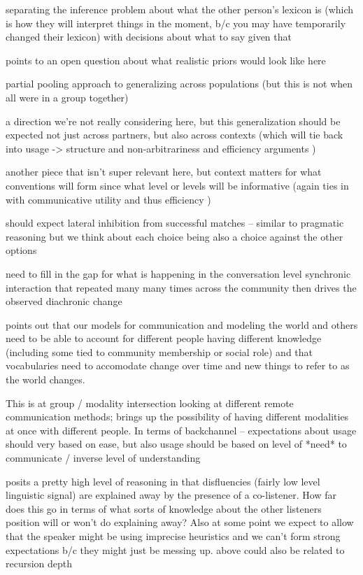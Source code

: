 \documentclass[]{article}
\begin{document}
\cite{hawkins2021} separating the inference problem about what the other person's lexicon is (which is how they will interpret things in the moment, b/c you may have temporarily changed their lexicon) with decisions about what to say given that 


points to an open question about what realistic priors would look like here

partial pooling approach to generalizing across populations (but this is not when all were in a group together) 

a direction we're not really considering here, but this generalization should be expected not just across partners, but also across contexts (which will tie back into usage -> structure and non-arbitrariness and efficiency arguments )


another piece that isn't super relevant here, but context matters for what conventions will form since what level or levels will be informative (again ties in with communicative utility and thus efficiency )

should expect lateral inhibition from successful matches -- similar to pragmatic reasoning but we think about each choice being also a choice against the other options 


need to fill in the gap for what is happening in the conversation level synchronic interaction that repeated many many times across the community then drives the observed diachronic change 

\cite{hawkins2021} points out that our models for communication and modeling the world and others need to be able to account for different people having different knowledge (including some tied to community membership or social role) and that vocabularies need to accomodate change over time and new things to refer to as the world changes. 

This is at group / modality intersection \cite{foxtree2013} looking at different remote communication methods; brings up the possibility of having different modalities at once with different people. In terms of backchannel -- expectations about usage should very based on ease, but also usage should be based on level of *need* to communicate / inverse level of understanding 


\cite{yoon2014} posits a pretty high level of reasoning in that disfluencies (fairly low level linguistic signal) are explained away by the presence of a co-listener. How far does this go in terms of what sorts of knowledge about the other listeners position will or won't do explaining away? Also at some point we expect to allow that the speaker might be using imprecise heuristics and we can't form strong expectations b/c they might just be messing up. 
above could also be related to recursion depth
\end{document}
